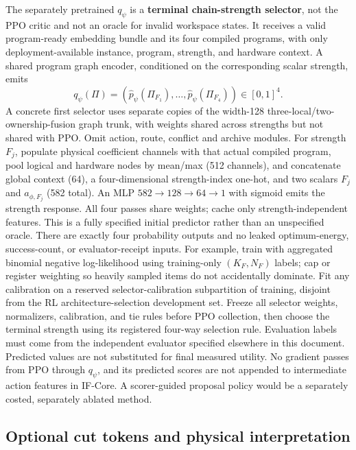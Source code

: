 The separately pretrained \(q_\psi\) is a \textbf{terminal chain-strength selector}, not the PPO critic and not an oracle for invalid workspace states. It receives a valid program-ready embedding bundle and its four compiled programs, with only deployment-available instance, program, strength, and hardware context. A shared program graph encoder, conditioned on the corresponding scalar strength, emits
\[
 q_\psi(\Pi)=
 (\widehat p_\psi(\Pi_{F_1}),\ldots,
  \widehat p_\psi(\Pi_{F_4}))\in[0,1]^4.
\]
A concrete first selector uses separate copies of the width-128 three-local/two-ownership-fusion graph trunk, with weights shared across strengths but not shared with PPO. Omit action, route, conflict and archive modules. For strength $F_j$, populate physical coefficient channels with that actual compiled program, pool logical and hardware nodes by mean/max (512 channels), and concatenate global context (64), a four-dimensional strength-index one-hot, and two scalars $F_j$ and $a_{\phi,F_j}$ (582 total). An MLP $582\to128\to64\to1$ with sigmoid emits the strength response. All four passes share weights; cache only strength-independent features. This is a fully specified initial predictor rather than an unspecified oracle. There are exactly four probability outputs and no leaked optimum-energy, success-count, or evaluator-receipt inputs. For example, train with aggregated binomial negative log-likelihood using training-only \((K_F,N_F)\) labels; cap or register weighting so heavily sampled items do not accidentally dominate. Fit any calibration on a reserved selector-calibration subpartition of training, disjoint from the RL architecture-selection development set. Freeze all selector weights, normalizers, calibration, and tie rules before PPO collection, then choose the terminal strength using its registered four-way selection rule. Evaluation labels must come from the independent evaluator specified elsewhere in this document. Predicted values are not substituted for final measured utility. No gradient passes from PPO through \(q_\psi\), and its predicted scores are not appended to intermediate action features in IF-Core. A scorer-guided proposal policy would be a separately costed, separately ablated method.

\subsection{Optional cut tokens and physical interpretation}

